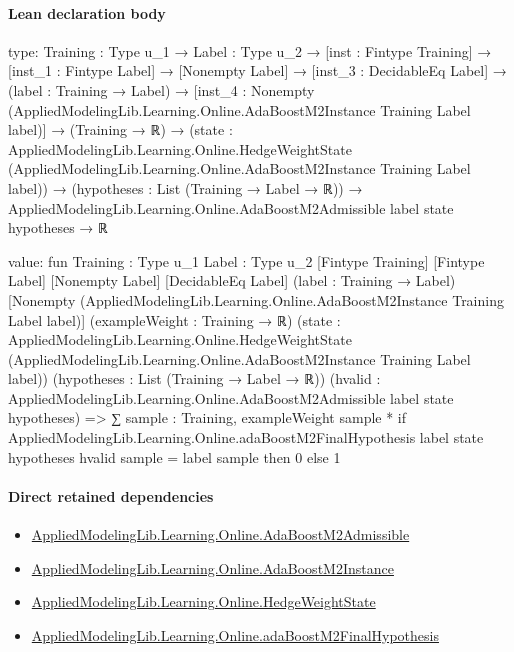 \documentclass[10pt]{article}
\begin{document}
\paragraph{Lean declaration body}
\begin{ReviewVerbatim}
type:
{Training : Type u_1} →
  {Label : Type u_2} →
    [inst : Fintype Training] →
      [inst_1 : Fintype Label] →
        [Nonempty Label] →
          [inst_3 : DecidableEq Label] →
            (label : Training → Label) →
              [inst_4 : Nonempty (AppliedModelingLib.Learning.Online.AdaBoostM2Instance Training Label label)] →
                (Training → ℝ) →
                  (state :
                      AppliedModelingLib.Learning.Online.HedgeWeightState
                        (AppliedModelingLib.Learning.Online.AdaBoostM2Instance Training Label label)) →
                    (hypotheses : List (Training → Label → ℝ)) →
                      AppliedModelingLib.Learning.Online.AdaBoostM2Admissible label state hypotheses → ℝ

value:
fun {Training : Type u_1} {Label : Type u_2} [Fintype Training] [Fintype Label] [Nonempty Label] [DecidableEq Label]
    (label : Training → Label) [Nonempty (AppliedModelingLib.Learning.Online.AdaBoostM2Instance Training Label label)]
    (exampleWeight : Training → ℝ)
    (state :
      AppliedModelingLib.Learning.Online.HedgeWeightState
        (AppliedModelingLib.Learning.Online.AdaBoostM2Instance Training Label label))
    (hypotheses : List (Training → Label → ℝ))
    (hvalid : AppliedModelingLib.Learning.Online.AdaBoostM2Admissible label state hypotheses) =>
  ∑ sample : Training,
    exampleWeight sample *
      if
          AppliedModelingLib.Learning.Online.adaBoostM2FinalHypothesis label state hypotheses hvalid sample =
            label sample then
        0
      else 1
\end{ReviewVerbatim}

\paragraph{Direct retained dependencies}
\begin{itemize}\raggedright
\item \hyperlink{governing-declaration-759a42c12a885c8e}{Applied\allowbreak{}Modeling\allowbreak{}Lib.\allowbreak{}Learning.\allowbreak{}Online.\allowbreak{}Ada\allowbreak{}Boost\allowbreak{}M2\allowbreak{}Admissible}
\item \hyperlink{governing-declaration-ffa271cbdc97d5db}{Applied\allowbreak{}Modeling\allowbreak{}Lib.\allowbreak{}Learning.\allowbreak{}Online.\allowbreak{}Ada\allowbreak{}Boost\allowbreak{}M2\allowbreak{}Instance}
\item \hyperlink{library-prerequisite-8196082d02788389}{Applied\allowbreak{}Modeling\allowbreak{}Lib.\allowbreak{}Learning.\allowbreak{}Online.\allowbreak{}Hedge\allowbreak{}Weight\allowbreak{}State}
\item \hyperlink{governing-declaration-b6e8a0444f293c12}{Applied\allowbreak{}Modeling\allowbreak{}Lib.\allowbreak{}Learning.\allowbreak{}Online.\allowbreak{}ada\allowbreak{}Boost\allowbreak{}M2\allowbreak{}Final\allowbreak{}Hypothesis}
\end{itemize}
\hypertarget{governing-declaration-06191eacd2ca1ced}{}
\end{document}

